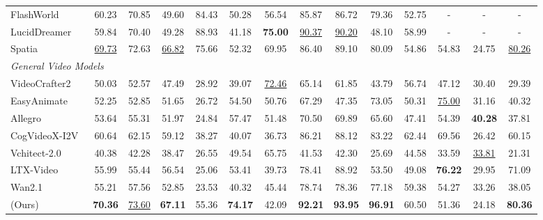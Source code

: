 \begin{table}
{\begin{tabular}{l|ccc|ccc|cccc|ccc}
        FlashWorld~\cite{li2025flashworld}           & 60.23 & 70.85 & 49.60 & 84.43 & 50.28 & 56.54 & 85.87 & 86.72 & 79.36 & 52.75 & - & - & - \\
        LucidDreamer~\cite{chung2023luciddreamer}    & 59.84 & 70.40 & 49.28 & 88.93 & 41.18 & \textbf{75.00} & \underline{90.37} & \underline{90.20} & 48.10 & 58.99 & - & - & - \\
        Spatia~\cite{zhao2026spatia}                 & \underline{69.73} & 72.63 & \underline{66.82} & 75.66 & 52.32 & 69.95 & 86.40 & 89.10 & 80.09 & 54.86 & 54.83 & 24.75 & \underline{80.26} \\
        \midrule
        \multicolumn{14}{l}{\textit{General Video Models}} \\
        VideoCrafter2~\cite{chen2024videocrafter2}   & 50.03 & 52.57 & 47.49 & 28.92 & 39.07 & \underline{72.46} & 65.14 & 61.85 & 43.79 & 56.74 & 47.12 & 30.40 & 29.39 \\
        EasyAnimate~\cite{xu2024easyanimate}         & 52.25 & 52.85 & 51.65 & 26.72 & 54.50 & 50.76 & 67.29 & 47.35 & 73.05 & 50.31 & \underline{75.00} & 31.16 & 40.32 \\
        Allegro~\cite{allegro2024}                   & 53.64 & 55.31 & 51.97 & 24.84 & 57.47 & 51.48 & 70.50 & 69.89 & 65.60 & 47.41 & 54.39 & \textbf{40.28} & 37.81 \\
        CogVideoX-I2V~\cite{yang2024cogvideox}       & 60.64 & 62.15 & 59.12 & 38.27 & 40.07 & 36.73 & 86.21 & 88.12 & 83.22 & 62.44 & 69.56 & 26.42 & 60.15 \\
        Vchitect-2.0~\cite{fan2025vchitect}          & 40.38 & 42.28 & 38.47 & 26.55 & 49.54 & 65.75 & 41.53 & 42.30 & 25.69 & 44.58 & 33.59 & \underline{33.81} & 21.31 \\
        LTX-Video~\cite{hacohen2024ltx}              & 55.99 & 55.44 & 56.54 & 25.06 & 53.41 & 39.73 & 78.41 & 88.92 & 53.50 & 49.08 & \textbf{76.22} & 29.95 & 71.09 \\
        Wan2.1~\cite{wan2025wan}                     & 55.21 & 57.56 & 52.85 & 23.53 & 40.32 & 45.44 & 78.74 & 78.36 & 77.18 & 59.38 & 54.27 & 33.26 & 38.05 \\
        \midrule
        \method{} (Ours)                             & \textbf{70.36} & \underline{73.60} & \textbf{67.11} & 55.36 & \textbf{74.17} & 42.09 & \textbf{92.21} & \textbf{93.95} & \textbf{96.91} & 60.50 & 51.36 & 24.18 & \textbf{80.36} \\
        \bottomrule
        \end{tabular}%
    }
    \label{tab:world-score}
\end{table}

